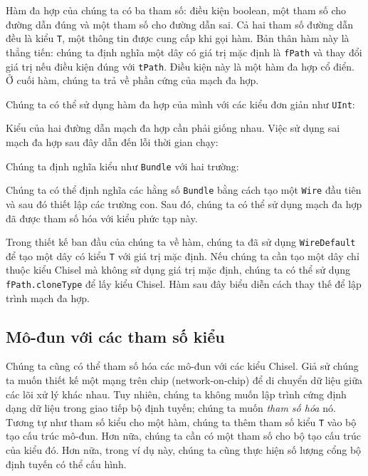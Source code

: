 \documentclass[%
    10pt,
    headinclude, footexclude,
    openright, %
    notitlepage,
    cleardoubleempty,
    headsepline,
    pointlessnumbers,
    bibtotoc, idxtotoc,
    ]{scrbook}
\newcommand{\code}[1]{{\small{\texttt{#1}}}}
\begin{document}
Hàm đa hợp của chúng ta có ba tham số: điều kiện boolean, một tham số cho đường dẫn đúng và một tham số cho đường dẫn sai. Cả hai tham số đường dẫn đều là kiểu \code{T}, một thông tin được cung cấp khi gọi hàm. Bản thân hàm này là thẳng tiến: chúng ta định nghĩa một dây có giá trị mặc định là \code{fPath} và thay đổi giá trị nếu điều kiện đúng với \code{tPath}. Điều kiện này là một hàm đa hợp cổ điển. Ở cuối hàm, chúng ta trả về phần cứng của mạch đa hợp.

Chúng ta có thể sử dụng hàm đa hợp của mình với các kiểu đơn giản như \code{UInt}: 


\noindent Kiểu của hai đường dẫn mạch đa hợp cần phải giống nhau. Việc sử dụng sai mạch đa hợp sau đây dẫn đến lỗi thời gian chạy: 


\noindent Chúng ta định nghĩa kiểu như \code{Bundle} với hai trường:


\noindent Chúng ta có thể định nghĩa các hằng số \code{Bundle} bằng cách tạo một \code{Wire} đầu tiên và sau đó thiết lập các trường con. Sau đó, chúng ta có thể sử dụng mạch đa hợp đã được tham số hóa với kiểu phức tạp này. 


Trong thiết kế ban đầu của chúng ta về hàm, chúng ta đã sử dụng \code{WireDefault} để tạo một dây có kiểu \code{T} với giá trị mặc định. Nếu chúng ta cần tạo một dây chỉ thuộc kiểu Chisel mà không sử dụng giá trị mặc định, chúng ta có thể sử dụng \code{fPath.cloneType} để lấy kiểu Chisel. Hàm sau đây biểu diễn cách thay thế để lập trình mạch đa hợp. 


\subsection{Mô-đun với các tham số kiểu}

Chúng ta cũng có thể tham số hóa các mô-đun với các kiểu Chisel. Giả sử chúng ta muốn thiết kế một mạng trên chip (network-on-chip) để di chuyển dữ liệu giữa các lõi xử lý khác nhau. Tuy nhiên, chúng ta không muốn lập trình cứng định dạng dữ liệu trong giao tiếp bộ định tuyến; chúng ta muốn \emph{tham số hóa} nó. Tương tự như tham số kiểu cho một hàm, chúng ta thêm tham số kiểu \code{T} vào bộ tạo cấu trúc mô-đun. Hơn nữa, chúng ta cần có một tham số cho bộ tạo cấu trúc của kiểu đó. Hơn nữa, trong ví dụ này, chúng ta cũng thực hiện số lượng cổng bộ định tuyến có thể cấu hình. 
\end{document}
